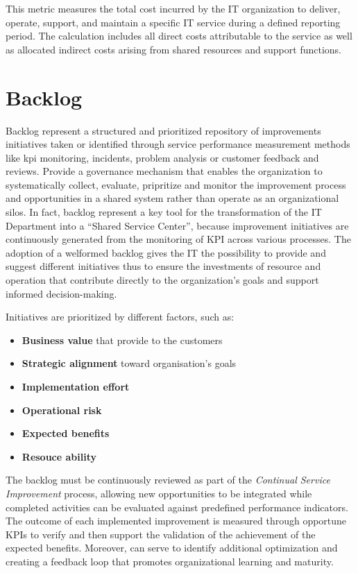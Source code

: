 This metric measures the total cost incurred by the IT organization to deliver, operate, support, and maintain a specific IT service during a defined reporting period. The calculation includes all direct costs attributable to the service as well as allocated indirect costs arising from shared resources and support functions.





\section{Backlog}
\label{subs:backlog}


Backlog represent a structured and prioritized repository of improvements initiatives taken or identified through service performance measurement methods like \gls{kpi} monitoring, incidents, problem analysis or customer feedback and reviews.
Provide a governance mechanism that enables the organization to systematically collect, evaluate, pripritize and monitor the improvement process and opportunities in a shared system rather than operate as an organizational silos.
In fact, backlog represent a key tool for the transformation of the IT Department into a ``Shared Service Center'', because improvement initiatives are continuously generated from the monitoring of KPI across various processes. The adoption of a welformed backlog gives the IT the possibility to provide and suggest different initiatives thus to ensure the investments of resource and operation that contribute directly to the organization's goals and  support informed decision-making.

Initiatives are prioritized by different factors, such as:
\begin{itemize}
    \item \textbf{Business value} that provide to the customers
    \item \textbf{Strategic alignment} toward organisation's goals
    \item \textbf{Implementation effort}
    \item \textbf{Operational risk}
    \item \textbf{Expected benefits}
    \item \textbf{Resouce ability}
\end{itemize}

The backlog must be continuously reviewed as part of the \textit{Continual Service Improvement} process, allowing new opportunities to be integrated while completed activities can be evaluated against predefined performance indicators.
The outcome of each implemented improvement is measured through opportune KPIs to verify and then support the validation of the achievement of the expected benefits. Moreover, can serve to identify additional optimization and creating a feedback loop that promotes organizational learning and maturity.


